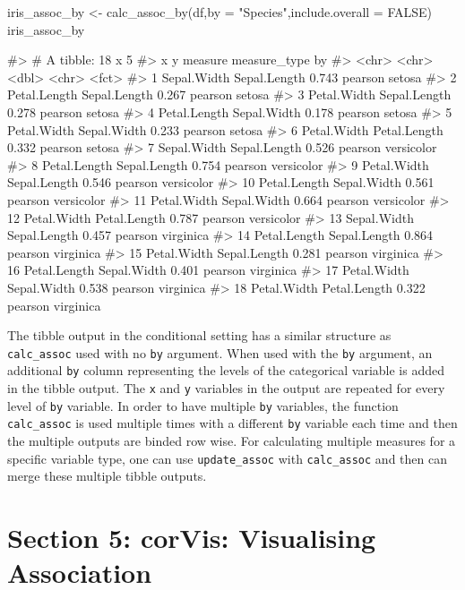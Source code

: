 \begin{Schunk}
\begin{Sinput}
iris_assoc_by <- calc_assoc_by(df,by = "Species",include.overall = FALSE)
iris_assoc_by
\end{Sinput}
\begin{Soutput}
#> # A tibble: 18 x 5
#>    x            y            measure measure_type by        
#>    <chr>        <chr>          <dbl> <chr>        <fct>     
#>  1 Sepal.Width  Sepal.Length   0.743 pearson      setosa    
#>  2 Petal.Length Sepal.Length   0.267 pearson      setosa    
#>  3 Petal.Width  Sepal.Length   0.278 pearson      setosa    
#>  4 Petal.Length Sepal.Width    0.178 pearson      setosa    
#>  5 Petal.Width  Sepal.Width    0.233 pearson      setosa    
#>  6 Petal.Width  Petal.Length   0.332 pearson      setosa    
#>  7 Sepal.Width  Sepal.Length   0.526 pearson      versicolor
#>  8 Petal.Length Sepal.Length   0.754 pearson      versicolor
#>  9 Petal.Width  Sepal.Length   0.546 pearson      versicolor
#> 10 Petal.Length Sepal.Width    0.561 pearson      versicolor
#> 11 Petal.Width  Sepal.Width    0.664 pearson      versicolor
#> 12 Petal.Width  Petal.Length   0.787 pearson      versicolor
#> 13 Sepal.Width  Sepal.Length   0.457 pearson      virginica 
#> 14 Petal.Length Sepal.Length   0.864 pearson      virginica 
#> 15 Petal.Width  Sepal.Length   0.281 pearson      virginica 
#> 16 Petal.Length Sepal.Width    0.401 pearson      virginica 
#> 17 Petal.Width  Sepal.Width    0.538 pearson      virginica 
#> 18 Petal.Width  Petal.Length   0.322 pearson      virginica
\end{Soutput}
\end{Schunk}

The tibble output in the conditional setting has a similar structure as
\texttt{calc\_assoc} used with no \texttt{by} argument. When used with
the \texttt{by} argument, an additional \texttt{by} column representing
the levels of the categorical variable is added in the tibble output.
The \texttt{x} and \texttt{y} variables in the output are repeated for
every level of \texttt{by} variable. In order to have multiple
\texttt{by} variables, the function \texttt{calc\_assoc} is used
multiple times with a different \texttt{by} variable each time and then
the multiple outputs are binded row wise. For calculating multiple
measures for a specific variable type, one can use
\texttt{update\_assoc} with \texttt{calc\_assoc} and then can merge
these multiple tibble outputs.

\hypertarget{section-5-corvis-visualising-association}{%
\section{Section 5: corVis: Visualising
Association}\label{section-5-corvis-visualising-association}}

